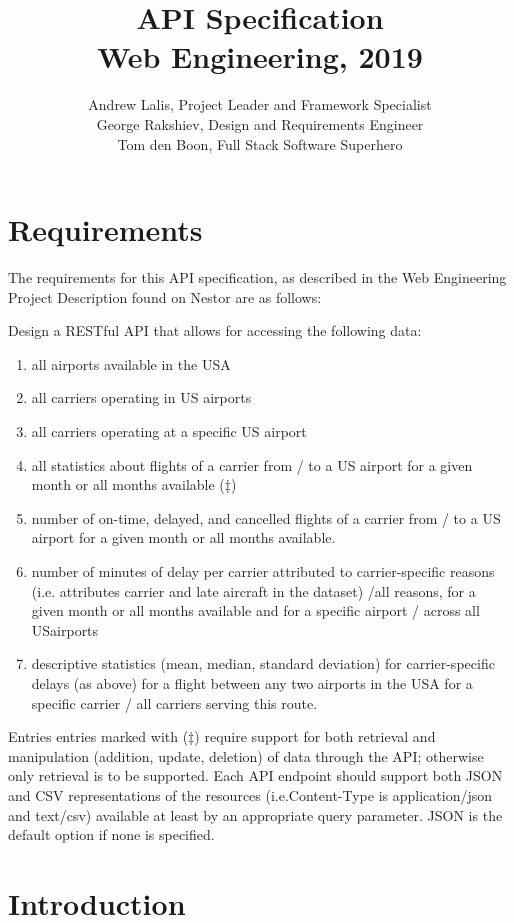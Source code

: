 \documentclass[a4paper, 12pt]{article}
\title{API Specification \\ \small{Web Engineering, 2019}}
\author{Andrew Lalis, Project Leader and Framework Specialist \\ 
George Rakshiev, Design and Requirements Engineer \\ 
Tom den Boon, Full Stack Software Superhero}
\begin{document}
\maketitle

\section{Requirements}
	The requirements for this API specification, as described in the Web Engineering Project Description found on Nestor are as follows:
	
	\noindent Design a RESTful API that allows for accessing the following data:
	
	\begin{enumerate}
		\item all airports available in the USA
		\item all carriers operating in US airports
		\item all carriers operating at a specific US airport
		\item all statistics about flights of a carrier from / to a US airport for a given month or all months available (‡)
		\item number of on-time, delayed, and cancelled flights of a carrier from / to a US airport for a given month or all months available.
		\item  number of minutes of delay per carrier attributed to carrier-specific reasons (i.e.  attributes carrier and late aircraft in  the  dataset) /all  reasons,  for  a given month or all months available and for a specific airport / across all USairports
		\item descriptive statistics (mean, median, standard deviation) for carrier-specific delays (as above) for a flight between any two airports in the USA for a specific carrier / all carriers serving this route.
	\end{enumerate}
	
	Entries entries marked with (‡) require support for both retrieval and manipulation  (addition,  update,  deletion)  of  data  through  the  API;  otherwise  only retrieval  is  to  be  supported.   Each  API  endpoint  should  support  both  JSON and CSV representations of the resources (i.e.Content-Type is application/json and text/csv) available at least by an appropriate query parameter.  JSON is the default option if none is specified.

\section{Introduction}
\end{document}
